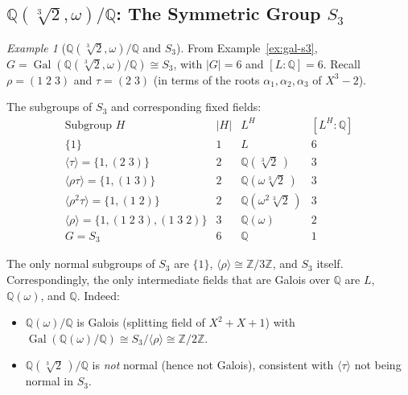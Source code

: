 \documentclass[12pt,a4paper,openany]{book}
\theoremstyle{definition}
\theoremstyle{remark}
\newtheorem{example}{Example}[chapter]
\newcommand{\Z}{\mathbb{Z}}
\newcommand{\Q}{\mathbb{Q}}
\DeclareMathOperator{\Gal}{Gal}
\begin{document}
\subsection{$\Q(\sqrt[3]{2},\omega)/\Q$: The Symmetric Group $S_{3}$}
\label{subsec:ex-s3-lattice}

\begin{example}[{$\Q(\sqrt[3]{2},\omega)/\Q$ and $S_{3}$}]
\label{ex:s3-lattice}
From Example~\ref{ex:gal-s3}, $G=\Gal(\Q(\sqrt[3]{2},\omega)/\Q)\cong S_{3}$,
with $|G|=6$ and $[L:\Q]=6$.  Recall $\rho=(1\;2\;3)$ and $\tau=(2\;3)$
(in terms of the roots $\alpha_{1},\alpha_{2},\alpha_{3}$ of $X^{3}-2$).

The subgroups of $S_{3}$ and corresponding fixed fields:
\[
\renewcommand{\arraystretch}{1.3}
\begin{array}{c|c|c|c}
  \text{Subgroup } H & |H| & L^{H} & [L^{H}:\Q] \\\hline
  \{1\} & 1 & L & 6 \\
  \langle\tau\rangle=\{1,(2\;3)\} & 2 & \Q(\sqrt[3]{2}\,) & 3 \\
  \langle\rho\tau\rangle=\{1,(1\;3)\} & 2 & \Q(\omega\sqrt[3]{2}\,) & 3 \\
  \langle\rho^{2}\tau\rangle=\{1,(1\;2)\} & 2 & \Q(\omega^{2}\sqrt[3]{2}\,) & 3 \\
  \langle\rho\rangle=\{1,(1\;2\;3),(1\;3\;2)\} & 3 & \Q(\omega) & 2 \\
  G=S_{3} & 6 & \Q & 1
\end{array}
\]

The only normal subgroups of $S_{3}$ are $\{1\}$, $\langle\rho\rangle
\cong\Z/3\Z$, and $S_{3}$ itself.  Correspondingly, the only intermediate
fields that are Galois over $\Q$ are $L$, $\Q(\omega)$, and $\Q$.  Indeed:
\begin{itemize}
\item $\Q(\omega)/\Q$ is Galois (splitting field of $X^{2}+X+1$) with
      $\Gal(\Q(\omega)/\Q)\cong S_{3}/\langle\rho\rangle\cong\Z/2\Z$.
\item $\Q(\sqrt[3]{2}\,)/\Q$ is \emph{not} normal (hence not Galois),
      consistent with $\langle\tau\rangle$ not being normal in $S_{3}$.
\end{itemize}


\end{example}
\end{document}
